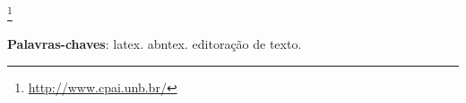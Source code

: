 \documentclass[
	12pt,				%
    oneside,            %
	a4paper,			%
	english,			%
	brazilian,		    %
	]{AcademicoUFT}
\begin{document}
\nocite{*} %
\frenchspacing %


\imprimircapa %
\imprimirfolhaderosto* %


\begin{agradecimentos}
\lipsum[1-2] %
\footnote{\url{http://www.cpai.unb.br/}} 

\end{agradecimentos}


\setlength{\absparsep}{18pt} %
\begin{resumo}
\lipsum[1-2] %

 \noindent
 \textbf{Palavras-chaves}: latex. abntex. editoração de texto.
\end{resumo}


\listoffigures*
\cleardoublepage


\listoftables*
\cleardoublepage
\end{document}
